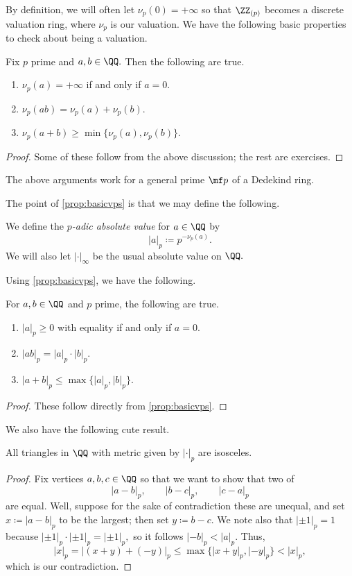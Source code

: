 \documentclass[../notes.tex]{subfiles}
\begin{document}
By definition, we will often let $\nu_p(0)=+\infty$ so that $\ZZ_{(p)}$ becomes a discrete valuation ring, where $\nu_p$ is our valuation. We have the following basic properties to check about being a valuation.
\begin{proposition} \label{prop:basicvps}
	Fix $p$ prime and $a,b\in\QQ.$ Then the following are true.
	\begin{enumerate}[label=(\alph*)]
		\item $\nu_p(a)=+\infty$ if and only if $a=0.$
		\item $\nu_p(ab)=\nu_p(a)+\nu_p(b).$
		\item $\nu_p(a+b)\ge\min\{\nu_p(a),\nu_p(b)\}.$
	\end{enumerate}
\end{proposition}
\begin{proof}
	Some of these follow from the above discussion; the rest are exercises.\todo{}
\end{proof}
\begin{remark}
	The above arguments work for a general prime $\mf p$ of a Dedekind ring.
\end{remark}
The point of \autoref{prop:basicvps} is that we may define the following.
\begin{defi}
	We define the \textit{$p$-adic absolute value} for $a\in\QQ$ by
	\[|a|_p\coloneqq p^{-\nu_p(a)}.\]
	We will also let $|\cdot|_\infty$ be the usual absolute value on $\QQ.$
\end{defi}
Using \autoref{prop:basicvps}, we have the following.
\begin{corollary}
	For $a,b\in\QQ$ and $p$ prime, the following are true.
	\begin{enumerate}[label=(\alph*)]
		\item $|a|_p\ge0$ with equality if and only if $a=0.$
		\item $|ab|_p=|a|_p\cdot|b|_p.$
		\item $|a+b|_p\le\max\{|a|_p,|b|_p\}.$
	\end{enumerate}
\end{corollary}
\begin{proof}
	These follow directly from \autoref{prop:basicvps}.
\end{proof}
We also have the following cute result.
\begin{proposition}
	All triangles in $\QQ$ with metric given by $|\cdot|_p$ are isosceles.
\end{proposition}
\begin{proof}
	Fix vertices $a,b,c\in\QQ$ so that we want to show that two of
	\[|a-b|_p,\qquad|b-c|_p,\qquad|c-a|_p\]
	are equal. Well, suppose for the sake of contradiction these are unequal, and set $x\coloneqq |a-b|_p$ to be the largest; then set $y\coloneqq b-c.$ We note also that $|\pm1|_p=1$ because $|\pm1|_p\cdot|\pm1|_p=|\pm1|_p,$ so it follows $|-b|_p<|a|_p.$ Thus,
	\[|x|_p=|(x+y)+(-y)|_p\le\max\{|x+y|_p,|-y|_p\}<|x|_p,\]
	which is our contradiction.
\end{proof}
\end{document}
